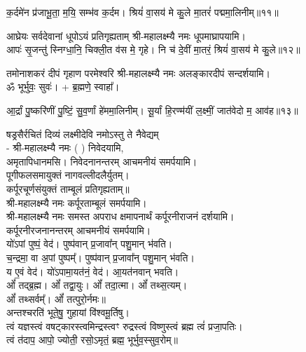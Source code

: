 \begin{center}

क॒र्दमे॑न प्र॑जाभू॒ता॒ म॒यि॒ सम्भ॑व क॒र्दम।
श्रियं॑ वा॒सय॑ मे कु॒ले मा॒तरं॑ पद्ममा॒लिनीम्॥११॥

{आघ्रेयः सर्वदेवानां धूपोऽयं प्रतिगृह्यताम्}
श्री-महालक्ष्म्यै नमः धूपमाघ्रापयामि।\\

आपः॑ सृ॒जन्तु॑ स्निग्धा॒नि॒ चिक्ली॒त व॑स मे॒ गृहे।
नि च॑ दे॒वीं मा॒तरं॒ श्रियं॑ वा॒सय॑ मे कु॒ले॥१२॥

{तमोनाशकरं दीपं गृहाण परमेश्वरि}
श्री-महालक्ष्म्यै नमः अलङ्कारदीपं सन्दर्शयामि।\\


ॐ भूर्भुवः॒ सुवः॑। + ब्र॒ह्मणे॒ स्वाहा᳚।

आ॒र्द्रां पु॒ष्करि॑णीं पु॒ष्टिं॒ सु॒व॒र्णां हे॑ममा॒लिनीम्।
सू॒र्यां हि॒रण्म॑यीं ल॒क्ष्मीं॒ जात॑वेदो म॒ आव॑ह॥१३॥

{षड्रसैर्रचितं दिव्यं लक्ष्मीदेवि नमोऽस्तु ते}
नैवेद्यम्\\
- श्री-महालक्ष्म्यै नमः (	) निवेदयामि, \\
अमृतापिधानमसि। निवेदनानन्तरम् आचमनीयं समर्पयामि।\\

पूगीफलसमायुक्तं नागवल्लीदलैर्युतम्।\\
कर्पूरचूर्णसंयुक्तं ताम्बूलं प्रतिगृह्यताम्॥\\
श्री-महालक्ष्म्यै नमः कर्पूरताम्बूलं समर्पयामि।\\

श्री-महालक्ष्म्यै नमः समस्त अपराध क्षमापनार्थं कर्पूरनीराजनं दर्शयामि।\\
कर्पूरनीरजनानन्तरम् आचमनीयं समर्पयामि।\\

 यो॑ऽपां पुष्पं॒ वेद॑। पुष्प॑वान् प्र॒जावा᳚न् पशु॒मान् भ॑वति।\\
च॒न्द्रमा॒ वा अ॒पां पुष्पम्᳚। पुष्प॑वान् प्र॒जावा᳚न् पशु॒मान् भ॑वति।\\
य ए॒वं वेद॑। यो॑ऽपामा॒यत॑नं॒ वेद॑। आ॒यत॑नवान् भवति।\\

ओं᳚ तद्ब्र॒ह्म। ओं᳚ तद्वा॒युः। ओं᳚ तदा॒त्मा। ओं᳚ तथ्स॒त्यम्‌।\\
ओं᳚ तथ्सर्वम्᳚‌। ओं᳚ तत्पुरो॒र्नमः॥\\

अन्तश्चरति॑ भूते॒षु॒ गुहायां वि॑श्वमू॒र्तिषु। \\
त्वं यज्ञस्त्वं वषट्कारस्त्वमिन्द्रस्त्वꣳ रुद्रस्त्वं विष्णुस्त्वं ब्रह्म त्वं॑ प्रजा॒पतिः। \\
त्वं त॑दाप॒ आपो॒ ज्योती॒ रसो॒ऽमृतं॒ ब्रह्म॒ भूर्भुव॒स्सुव॒रोम्‌॥\\


\end{center}
